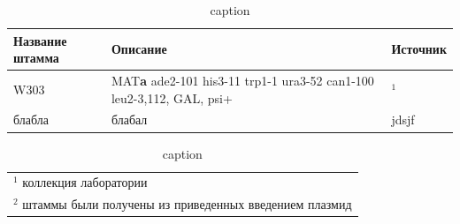 


\begin{table}[p]
	\small
	\caption{caption}
	\label{table:strains}
	\begin{tabular}{ p{0.25\width - \tabcolsep} p{0.65\width - 2\tabcolsep}  p{0.1\width - \tabcolsep}}
		\graytable
		\toprule
		Название штамма & Описание & Источник \\ 
		\midrule
		W303 & MAT\textbf{a} ade2-101 his3-11 trp1-1 ura3-52 can1-100 leu2-3,112, GAL, psi+ & $^1$ \\  \invisiblerule
		\midrule

		
		блабла & блабал & jdsjf \\
		\bottomrule
	\end{tabular}
	
	
	\begin{tabular}{p{1\width}}
			$^1$ коллекция лаборатории \\
			$^2$ штаммы были получены из приведенных введением плазмид
			\\
	\end{tabular}
	
\end{table}


